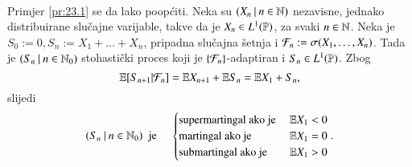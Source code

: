 \begin{pr}  \label{pr:23.8}
    \quad \\
    Primjer \ref{pr:23.1} se da lako poop\' citi.
    Neka su $({X_n} \: | \: {n \in \mathbb{N}})$ nezavisne, jednako distribuirane slu\v cajne varijable, takve da je $X_n \in L^1 (\mathbb{P})$, za svaki $n \in \mathbb{N}$.
    Neka je $S_0 := 0, S_n := X_1 + \ldots + X_n$, pripadna slu\v cajna \v setnja i $\mathcal{F}_n := \sigma({X_1, \ldots, X_n})$.
    Tada je $({S_n} \: | \: {n \in \mathbb{N}_0})$ stohasti\v cki proces koji je $\{\mathcal{F}_n\}$-adaptiran i $S_n \in L^1 (\mathbb{P})$.
    Zbog
    \begin{equation*}
        \mathbb{E} [S_{n+1} | \mathcal{F}_n] = \mathbb{E} X_{n + 1} + \mathbb{E} S_n = \mathbb{E} X_1 + S_n,
    \end{equation*}
    slijedi
    \begin{equation*}
        ({S_n} \: | \: {n \in \mathbb{N}_0}) \; \textnormal{ je } \quad
        \begin{cases}
            \textnormal{supermartingal ako je } &\mathbb{E} X_1 < 0\\
            \textnormal{martingal ako je } &\mathbb{E} X_1 = 0\\
            \textnormal{submartingal ako je } &\mathbb{E} X_1 > 0
        \end{cases}.
    \end{equation*}
\end{pr}

